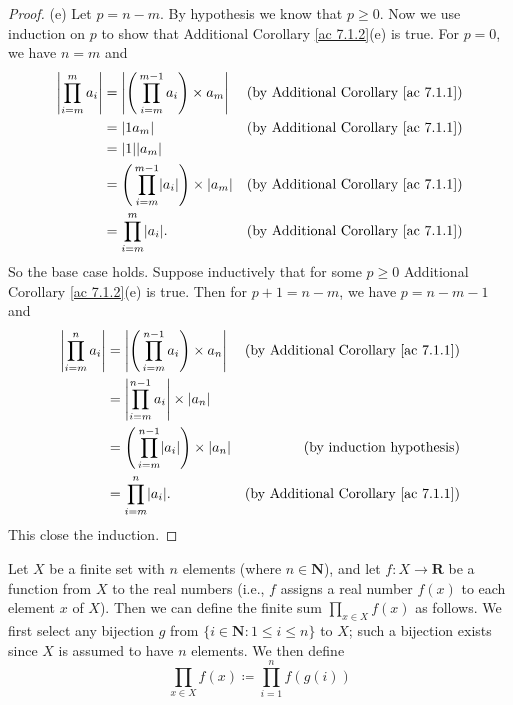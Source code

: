 \begin{proof}{(e)}
    Let \(p = n - m\).
    By hypothesis we know that \(p \geq 0\).
    Now we use induction on \(p\) to show that Additional Corollary \ref{ac 7.1.2}(e) is true.
    For \(p = 0\), we have \(n = m\) and
    \begin{align*}
        \abs*{\prod_{i = m}^m a_i} & = \abs*{\Bigg(\prod_{i = m}^{m - 1} a_i\Bigg) \times a_m}        & \text{(by Additional Corollary \ref{ac 7.1.1})} \\
                                   & = \abs*{1a_m}                                                    & \text{(by Additional Corollary \ref{ac 7.1.1})} \\
                                   & = \abs*{1}\abs*{a_m}                                                                                               \\
                                   & = \Bigg(\prod_{i = m}^{m - 1} \abs*{a_i}\Bigg) \times \abs*{a_m} & \text{(by Additional Corollary \ref{ac 7.1.1})} \\
                                   & = \prod_{i = m}^m \abs*{a_i}.                                    & \text{(by Additional Corollary \ref{ac 7.1.1})}
    \end{align*}
    So the base case holds.
    Suppose inductively that for some \(p \geq 0\) Additional Corollary \ref{ac 7.1.2}(e) is true.
    Then for \(p + 1 = n - m\), we have \(p = n - m - 1\) and
    \begin{align*}
        \abs*{\prod_{i = m}^n a_i} & = \abs*{\Bigg(\prod_{i = m}^{n - 1} a_i\Bigg) \times a_n}        & \text{(by Additional Corollary \ref{ac 7.1.1})} \\
                                   & = \abs*{\prod_{i = m}^{n - 1} a_i} \times \abs*{a_n}                                                               \\
                                   & = \Bigg(\prod_{i = m}^{n - 1} \abs*{a_i}\Bigg) \times \abs*{a_n} & \text{(by induction hypothesis)}                \\
                                   & = \prod_{i = m}^n \abs*{a_i}.                                    & \text{(by Additional Corollary \ref{ac 7.1.1})}
    \end{align*}
    This close the induction.
\end{proof}

\begin{additional corollary}\label{ac 7.1.3}
Let \(X\) be a finite set with \(n\) elements (where \(n \in \mathbf{N}\)), and let \(f : X \to \mathbf{R}\) be a function from \(X\) to the real numbers
(i.e., \(f\) assigns a real number \(f(x)\) to each element \(x\) of \(X\)).
Then we can define the finite sum \(\prod_{x \in X} f(x)\) as follows.
We first select any bijection \(g\) from \(\{i \in \mathbf{N} : 1 \leq i \leq n\}\) to \(X\);
such a bijection exists since \(X\) is assumed to have \(n\) elements.
We then define
\[
    \prod_{x \in X} f(x) \coloneqq \prod_{i = 1}^n f(g(i))
\]
\end{additional corollary}

